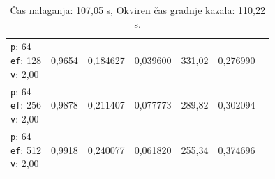 \begin{table}[htbp]
\begin{tabularx}{\textwidth}{Xrrrrrr}
    \makecell{\texttt{p}: 64\\\texttt{ef}: 128\\\texttt{v}: 2,00} & 0,9654 & 0,184627 & 0,039600 & 331,02 & 0,276990 \\
    \makecell{\texttt{p}: 64\\\texttt{ef}: 256\\\texttt{v}: 2,00} & 0,9878 & 0,211407 & 0,077773 & 289,82 & 0,302094 \\
    \makecell{\texttt{p}: 64\\\texttt{ef}: 512\\\texttt{v}: 2,00} & 0,9918 & 0,240077 & 0,061820 & 255,34 & 0,374696 \\
    \bottomrule
  \end{tabularx}
\caption* {Čas nalaganja: 107,05 s, Okviren čas gradnje kazala: 110,22 s.}\end{table}

